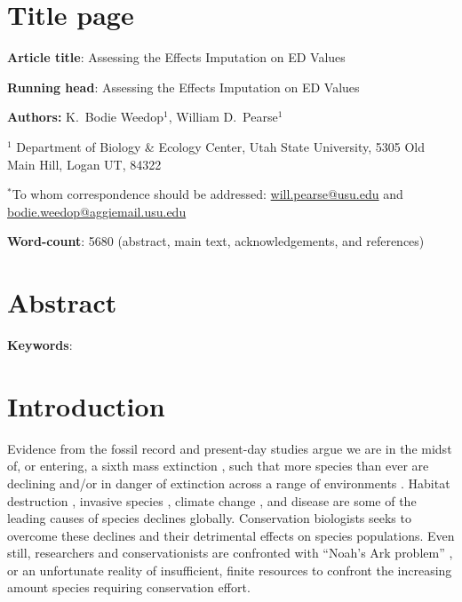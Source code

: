 \documentclass[12pt,english]{article}
\begin{document}
\setlength{\parindent}{0pt}
\section*{Title page}

\textbf{Article title}: Assessing the Effects Imputation on ED Values

\textbf{Running head}: Assessing the Effects Imputation on ED Values

\textbf{Authors:} K.\ Bodie Weedop$^{1}$, William D.\ Pearse$^{1}$\

$^1$ Department of Biology \& Ecology Center, Utah State University,
5305 Old Main Hill, Logan UT, 84322

$^*$To whom correspondence should be addressed:
\url{will.pearse@usu.edu} and \url{bodie.weedop@aggiemail.usu.edu}

\textbf{Word-count}: 5680 (abstract, main text, acknowledgements, and references)

\clearpage
\section*{Abstract}


\textbf{Keywords}: 

\clearpage
\section*{Introduction}
Evidence from the fossil record and present-day studies argue we are
in the midst of, or entering, a sixth mass extinction \autocite{Barnosky2011, Ceballos2015}, such that more species than ever are
declining and/or in danger of extinction across a range of
environments \autocite{Wake2008,Thomas2004}. Habitat destruction
\autocite{Brooks2002}, invasive species
\autocite{Molnar2008}, climate change
\autocite{Pounds2006}, and disease \autocite{Lips2006} are some of
the leading causes of species declines globally. Conservation
biologists seeks to overcome these declines and their detrimental
effects on species populations. Even still, researchers and
conservationists are confronted with ``Noah's Ark problem''
\autocite{Weitzman1998}, or an unfortunate reality of insufficient,
finite resources to confront the increasing amount species requiring
conservation effort.
\end{document}
